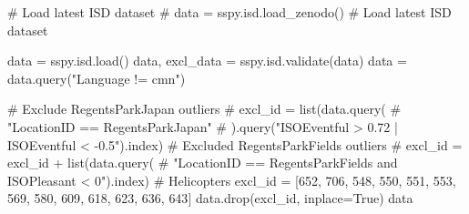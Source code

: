 \documentclass[
  authoryear,
  preprint,
  3p]{elsarticle}
\newenvironment{Shaded}{\begin{snugshade}}{\end{snugshade}}
\newcommand{\CommentTok}[1]{\textcolor[rgb]{0.37,0.37,0.37}{#1}}
\newcommand{\DecValTok}[1]{\textcolor[rgb]{0.68,0.00,0.00}{#1}}
\newcommand{\NormalTok}[1]{\textcolor[rgb]{0.00,0.23,0.31}{#1}}
\newcommand{\OperatorTok}[1]{\textcolor[rgb]{0.37,0.37,0.37}{#1}}
\newcommand{\StringTok}[1]{\textcolor[rgb]{0.13,0.47,0.30}{#1}}
\newcommand{\VariableTok}[1]{\textcolor[rgb]{0.07,0.07,0.07}{#1}}
\begin{document}
\begin{Shaded}
\begin{Highlighting}[]
\CommentTok{\# Load latest ISD dataset}
\CommentTok{\# data = sspy.isd.load\_zenodo()}
\CommentTok{\# Load latest ISD dataset}

\NormalTok{data }\OperatorTok{=}\NormalTok{ sspy.isd.load()}
\NormalTok{data, excl\_data }\OperatorTok{=}\NormalTok{ sspy.isd.validate(data)}
\NormalTok{data }\OperatorTok{=}\NormalTok{ data.query(}\StringTok{"Language != \textquotesingle{}cmn\textquotesingle{}"}\NormalTok{)}

\CommentTok{\# Exclude RegentsParkJapan outliers}
\CommentTok{\# excl\_id = list(data.query(}
    \CommentTok{\# "LocationID == \textquotesingle{}RegentsParkJapan\textquotesingle{}"}
    \CommentTok{\# ).query("ISOEventful \textgreater{} 0.72 | ISOEventful \textless{} {-}0.5").index)}
\CommentTok{\# Excluded RegentsParkFields outliers}
\CommentTok{\# excl\_id = excl\_id + list(data.query(}
    \CommentTok{\# "LocationID == \textquotesingle{}RegentsParkFields\textquotesingle{} and ISOPleasant \textless{} 0").index) \# Helicopters}
\NormalTok{excl\_id }\OperatorTok{=}\NormalTok{ [}\DecValTok{652}\NormalTok{, }\DecValTok{706}\NormalTok{, }\DecValTok{548}\NormalTok{, }\DecValTok{550}\NormalTok{, }\DecValTok{551}\NormalTok{, }\DecValTok{553}\NormalTok{, }\DecValTok{569}\NormalTok{, }\DecValTok{580}\NormalTok{, }\DecValTok{609}\NormalTok{, }\DecValTok{618}\NormalTok{, }\DecValTok{623}\NormalTok{, }\DecValTok{636}\NormalTok{, }\DecValTok{643}\NormalTok{]}
\NormalTok{data.drop(excl\_id, inplace}\OperatorTok{=}\VariableTok{True}\NormalTok{)}
\NormalTok{data}
\end{Highlighting}
\end{Shaded}
\end{document}
